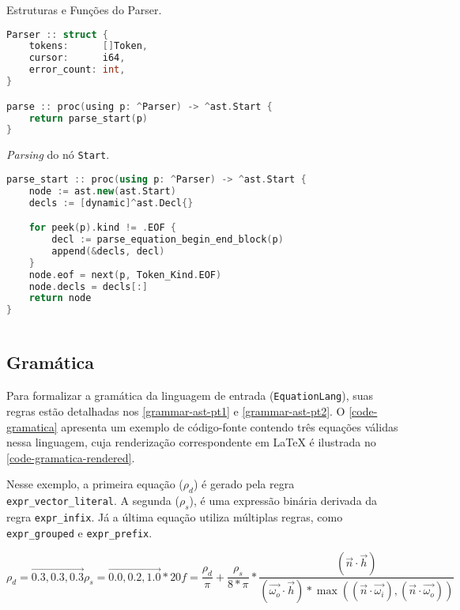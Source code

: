 \begin{codigo}[htb]
        \caption{\small Estruturas e Funções do Parser. }
        \label{cod-func-and-structs}
  \begin{lstlisting}[language = C]
Parser :: struct {
    tokens:      []Token,
    cursor:      i64,
    error_count: int,
}

parse :: proc(using p: ^Parser) -> ^ast.Start {
    return parse_start(p)
}
  \end{lstlisting}
\end{codigo}

\begin{codigo}[htb]
    \caption{\small \textit{Parsing} do nó \texttt{Start}. }
        \label{cod-parsing-start}
  \begin{lstlisting}[language=C++]
parse_start :: proc(using p: ^Parser) -> ^ast.Start {
    node := ast.new(ast.Start)
    decls := [dynamic]^ast.Decl{}

    for peek(p).kind != .EOF {
        decl := parse_equation_begin_end_block(p)
        append(&decls, decl)
    }
    node.eof = next(p, Token_Kind.EOF)
    node.decls = decls[:]
    return node
}
    
  \end{lstlisting}
\end{codigo}



\subsection{Gramática}


Para formalizar a gramática da linguagem de entrada (\texttt{EquationLang}), suas regras estão detalhadas nos \autoref{grammar-ast-pt1} e \autoref{grammar-ast-pt2}. O \autoref{code-gramatica} apresenta um exemplo de código-fonte contendo três equações válidas nessa linguagem, cuja renderização correspondente em \LaTeX{} é ilustrada no \autoref{code-gramatica-rendered}.

Nesse exemplo, a primeira equação ($\rho_{d}$) é gerado pela regra \verb"expr_vector_literal". A segunda ($\rho_{s}$), é uma expressão binária derivada da regra \verb"expr_infix". Já a última equação utiliza múltiplas regras, como \verb"expr_grouped" e \verb"expr_prefix".


\label{code-gramatica-rendered} \begin{subequations}
\begin{equation}
    \rho_{d} = \vec{0.3,0.3,0.3}
\end{equation}
\begin{equation}
    \rho_{s} = \vec{0.0,0.2,1.0} * 20
\end{equation}
\begin{equation}
f = \frac{\rho_{d}}{\pi} + \frac{\rho_{s}}{8*\pi} * \frac{({\vec{n}}\cdot{\vec{h}})} {({\vec{\omega_{o}}}\cdot{\vec{h}}) * \max(({\vec{n}}\cdot{\vec{\omega_{i}}}), ({\vec{n}}\cdot{\vec{\omega_{o}}}))}
\end{equation}
\end{subequations}


